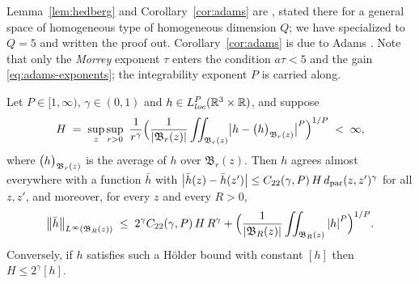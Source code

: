 \documentclass[11pt,reqno]{amsart}
\begin{document}
\begin{remark}\label{rem:adams-source}
Lemma~\ref{lem:hedberg} and Corollary~\ref{cor:adams} are
\cite[Lemma 5.3 and Corollary 5.1, p.~93--94]{LemarieRieusset2016}, stated
there for a general space of homogeneous type of homogeneous dimension $Q$; we
have specialized to $Q=5$ and written the proof out. Corollary~\ref{cor:adams}
is due to Adams \cite{Adams1975}. Note that only the \emph{Morrey} exponent
$\tau$ enters the condition $a\tau<5$ and the gain
\eqref{eq:adams-exponents}; the integrability exponent $P$ is carried along.
\end{remark}

\begin{lemma}\label{lem:campanato}
Let $P\in[1,\infty)$, $\gamma\in(0,1)$ and $h\in L^{P}_{loc}(\mathbb{R}^{3}\times\mathbb{R})$,
and suppose
\[
  H\;=\;\sup_{z}\sup_{r>0}\ \frac{1}{r^{\gamma}}
    \Bigl(\frac{1}{\abs{\mathfrak{B}_{r}(z)}}
      \iint_{\mathfrak{B}_{r}(z)}
        \bigl|h-\textstyle\stavg{h}{\mathfrak{B}_{r}(z)}\bigr|^{P}\Bigr)^{1/P}
  \;<\;\infty ,
\]
where $\bigl(h\bigr)_{\mathfrak{B}_{r}(z)}$ is the average of $h$ over
$\mathfrak{B}_{r}(z)$. Then $h$ agrees almost everywhere with a function
$\bar h$ with
$\left\lvert \bar h(z)-\bar h(z') \right\rvert\le C_{22}(\gamma,P)\,H\,d_{\mathrm{par}}(z,z')^{\gamma}$ for all
$z,z'$, and moreover, for every $z$ and every $R>0$,
\begin{equation}\label{eq:campanato-Linfty}
  \left\lVert \bar h \right\rVert_{L^{\infty}(\mathfrak{B}_{R}(z))}
  \;\le\;2^{\gamma}C_{22}(\gamma,P)\,H\,R^{\gamma}
   +\Bigl(\frac1{\left\lvert \mathfrak{B}_{R}(z) \right\rvert}
      \iint_{\mathfrak{B}_{R}(z)}\left\lvert h \right\rvert^{P}\Bigr)^{1/P}.
\end{equation}
Conversely, if $h$ satisfies such a H\"older bound with constant $[h]$ then
$H\le2^{\gamma}[h]$.
\end{lemma}
\end{document}
